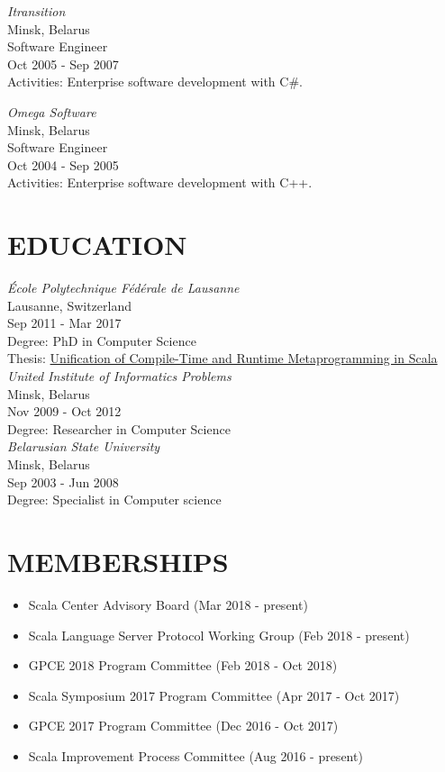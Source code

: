 \documentclass[margin, 10pt]{Stylesheet}
\begin{document}
\begin{resume}
\emph{Itransition} \\
Minsk, Belarus \\
Software Engineer \\
Oct 2005 - Sep 2007 \\
Activities: Enterprise software development with C\#.

\emph{Omega Software} \\
Minsk, Belarus \\
Software Engineer \\
Oct 2004 - Sep 2005 \\
Activities: Enterprise software development with C++.

\section{EDUCATION}

\emph{\'{E}cole Polytechnique F\'{e}d\'{e}rale de Lausanne} \\
Lausanne, Switzerland \\
Sep 2011 - Mar 2017 \\
Degree: PhD in Computer Science \\
Thesis: \href{https://infoscience.epfl.ch/record/226166}{Unification of Compile-Time and Runtime Metaprogramming in Scala} \\

\emph{United Institute of Informatics Problems} \\
Minsk, Belarus \\
Nov 2009 - Oct 2012 \\
Degree: Researcher in Computer Science \\

\emph{Belarusian State University} \\
Minsk, Belarus \\
Sep 2003 - Jun 2008 \\
Degree: Specialist in Computer science \\

\section{MEMBERSHIPS}

\begin{itemize} \itemsep -2pt
\item Scala Center Advisory Board (Mar 2018 - present)
\item Scala Language Server Protocol Working Group (Feb 2018 - present)
\item GPCE 2018 Program Committee (Feb 2018 - Oct 2018)
\item Scala Symposium 2017 Program Committee (Apr 2017 - Oct 2017)
\item GPCE 2017 Program Committee (Dec 2016 - Oct 2017)
\item Scala Improvement Process Committee (Aug 2016 - present)
\end{itemize}


\end{resume}
\end{document}
